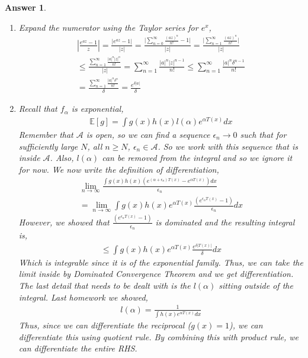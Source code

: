\documentclass[12pt]{article}
\theoremstyle{colon}
\newtheorem*{answer}{Answer}
\begin{document}
\begin{answer}
  \leavevmode
  \begin{enumerate}[label=\arabic*)]
    \item Expand the numerator using the Taylor series for $e^x$,
      \begin{gather*}
        \left \lvert \frac{e^{az}-1}{z} \right \rvert = \frac{\lvert e^{az}-1 \rvert}{\lvert z \rvert} = \frac{\lvert \sum_{n=0}^\infty \frac{(az)^n}{n!} -1 \rvert}{\lvert z \rvert} = \frac{\lvert \sum_{n=1}^\infty \frac{(az)^n}{n!} \rvert}{\lvert z \rvert} \\
        \leq \frac{\sum_{n=1}^\infty \frac{\lvert a \rvert^n \lvert z \rvert^n}{n!}}{\lvert z \rvert} = \sum_{n=1}^\infty \frac{\lvert a \rvert^n \lvert z \rvert^{n-1}}{n!} \leq \sum_{n=1}^\infty \frac{\lvert a \rvert^n \delta^{n-1}}{n!} \\
        = \frac{\sum_{n=1}^\infty \frac{\lvert a \rvert^n \delta^n}{n!}}{\delta} = \frac{e^{\delta \lvert a \rvert}}{\delta}
      \end{gather*}
    \item Recall that $f_\alpha$ is exponential,
      \begin{gather*}
        \mathbb{E}[g] = \int g(x) h(x) l(\alpha) e^{\alpha T(x)} dx
      \end{gather*}
      Remember that $\mathcal{A}$ is open, so we can find a sequence $\epsilon_n \rightarrow 0$ such that for sufficiently large $N$, all $n \geq N$, $\epsilon_n \in \mathcal{A}$. So we work with this sequence that is inside $\mathcal{A}$. Also, $l(\alpha)$ can be removed from the integral and so we ignore it for now. We now write the definition of differentiation,
      \begin{gather*}
        \lim_{n \rightarrow \infty} \frac{\int g(x) h(x) (e^{(\alpha + \epsilon_n) T(x)} - e^{\alpha T(x)}) dx}{\epsilon_n} \\
        = \lim_{n \rightarrow \infty} \int g(x) h(x) e^{\alpha T(x)} \frac{(e^{\epsilon_n T(x)} - 1)}{\epsilon_n} dx
      \end{gather*}
      However, we showed that $\frac{(e^{\epsilon_n T(x)} - 1)}{\epsilon_n}$ is dominated and the resulting integral is,
      \begin{gather*}
        \leq \int g(x) h(x) e^{\alpha T(x)} \frac{e^{\delta \lvert T(x) \rvert}}{\delta} dx
      \end{gather*}
      Which is integrable since it is of the exponential family. Thus, we can take the limit inside by Dominated Convergence Theorem and we get differentiation. The last detail that needs to be dealt with is the $l(\alpha)$ sitting outside of the integral. Last homework we showed,
      \begin{gather*}
        l(\alpha) = \frac{1}{\int h(x) e^{\alpha T(x)} dx}
      \end{gather*}
      Thus, since we can differentiate the reciprocal ($g(x)=1$), we can differentiate this using quotient rule. By combining this with product rule, we can differentiate the entire RHS.
  \end{enumerate}
\end{answer}
\end{document}
